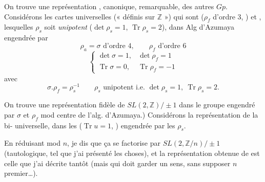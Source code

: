 \documentclass[11pt,a4paper]{article}
\begin{document}
On trouve une représentation , canonique, remarquable, des autres \ill{} \ill{} $Gp$.  Considérons les cartes universelles (« définis sur $\mathbb{Z}$ ») qui sont ($\rho_f$ d'ordre $3$, ) et  \ill{} , lesquelles $\rho_s$ soit \emph{unipotent} ($\det\rho_s = 1$, $\operatorname{Tr}\rho_s = 2$), dans Alg d'Azumaya engendrée par
\[
  \rho_a = \sigma \text{ d'ordre } 4, \qquad \rho_f \text{ d'ordre } 6
\]
\[
  \left\{
  \begin{array}{ll}
    \det\sigma = 1 , & \det\rho_f = 1 \\
    \operatorname{Tr}\sigma = 0 , & \operatorname{Tr}\rho_f = -1
  \end{array}
  \right.
\]
avec
\[
  \sigma . \rho_f = \rho_s^{-1} \qquad \rho_s \text{ unipotent i.e. } \det\rho_s = 1,\ \operatorname{Tr}\rho_s = 2 .
\]


On trouve une représentation fidèle de $SL(2,\mathbb{Z})/\pm 1$ dans le groupe engendré par $\sigma$ et $\rho_f$ mod centre de l'alg. d'Azumaya.)  Considérons  la représentation de la  bi- universelle, dans les \add{\ill{}} \struck{\ill{}} \ill{} ($\operatorname{Tr} u = 1$, \ill{}) engendrée par les \struck{\ill{}} $\rho_s$. 

En réduisant mod $n$, je dis que ça se factorise par $SL(2,\mathbb{Z}/n)/\pm 1$ (tautologique, tel que j'ai présenté les choses), et la représentation obtenue de  est celle que j'ai décrite tantôt (mais qui doit garder un sens, sans supposer $n$ premier…).
\end{document}
